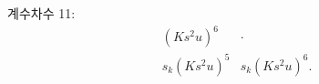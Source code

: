 
\noindent 계수차수 11:
\[
\begin{array}{cc}
(Ks^2u)^6&\cdot\\
s_k(Ks^2u)^5&s_k(Ks^2u)^6.
\end{array}
\]
